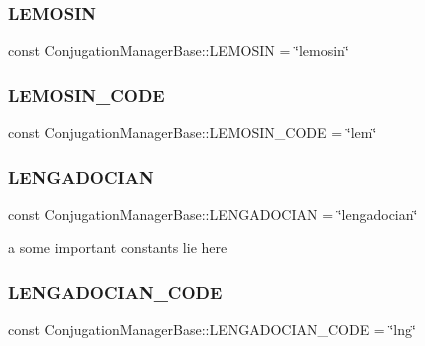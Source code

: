 \subsubsection{\texorpdfstring{L\+E\+M\+O\+S\+IN}{LEMOSIN}}
{\footnotesize\ttfamily const Conjugation\+Manager\+Base\+::\+L\+E\+M\+O\+S\+IN = \char`\"{}lemosin\char`\"{}}

\hypertarget{class_conjugation_manager_base_ab0a3fa2a7d3193603810cf5bed0a43b4}{}\label{class_conjugation_manager_base_ab0a3fa2a7d3193603810cf5bed0a43b4} 
\subsubsection{\texorpdfstring{L\+E\+M\+O\+S\+I\+N\+\_\+\+C\+O\+DE}{LEMOSIN\_CODE}}
{\footnotesize\ttfamily const Conjugation\+Manager\+Base\+::\+L\+E\+M\+O\+S\+I\+N\+\_\+\+C\+O\+DE = \char`\"{}lem\char`\"{}}

\hypertarget{class_conjugation_manager_base_aa525010174d498dcf8d808cd3260ec02}{}\label{class_conjugation_manager_base_aa525010174d498dcf8d808cd3260ec02} 
\subsubsection{\texorpdfstring{L\+E\+N\+G\+A\+D\+O\+C\+I\+AN}{LENGADOCIAN}}
{\footnotesize\ttfamily const Conjugation\+Manager\+Base\+::\+L\+E\+N\+G\+A\+D\+O\+C\+I\+AN = \char`\"{}lengadocian\char`\"{}}

a some important constants lie here \hypertarget{class_conjugation_manager_base_a4553efa71470b7eeed6ee2990c401b79}{}\label{class_conjugation_manager_base_a4553efa71470b7eeed6ee2990c401b79} 
\subsubsection{\texorpdfstring{L\+E\+N\+G\+A\+D\+O\+C\+I\+A\+N\+\_\+\+C\+O\+DE}{LENGADOCIAN\_CODE}}
{\footnotesize\ttfamily const Conjugation\+Manager\+Base\+::\+L\+E\+N\+G\+A\+D\+O\+C\+I\+A\+N\+\_\+\+C\+O\+DE = \char`\"{}lng\char`\"{}}

